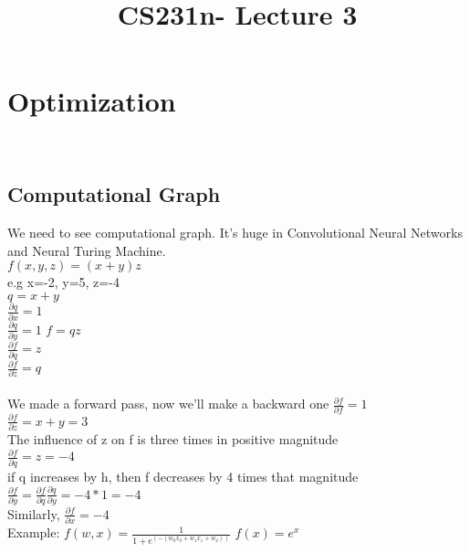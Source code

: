 \documentclass{article}
\begin{document}
\title{CS231n- Lecture 3}
\maketitle
\section{Optimization}
\ \subsection{Computational Graph}
We need to see computational graph. It's huge in Convolutional Neural Networks and Neural Turing Machine.\\
$f(x,y,z)=(x+y)z$ \\
e.g x=-2, y=5, z=-4\\
$q=x+y$ \\ $\frac{\partial q}{\partial x}=1$ \\ $\frac{\partial q}{\partial y}=1$
$f=qz$ \\ $\frac{\partial f}{\partial q}=z$ \\ $\frac{\partial f}{\partial z} = q$ \\
\\ We made a forward pass, now we'll make a backward one
$\frac{\partial f}{\partial f}=1$ \\
$\frac{\partial f}{\partial z}=x+y=3$ \\ The influence of z on f is three times in positive magnitude \\
$\frac{\partial f}{\partial q}=z=-4$ \\  if q increases by h, then f decreases by 4 times that magnitude
$\frac{\partial f}{\partial y} = \frac{\partial f}{\partial q} \frac{\partial q}{\partial y}=-4 * 1 = -4$ \\
Similarly, $\frac{\partial f}{\partial x} = -4$  \\
Example: $f(w,x)= \frac{1}{1+e^(-(w_0 x_0 + w_1 x_1 + w_2))}$
$f(x) = e^x $
\end{document}
